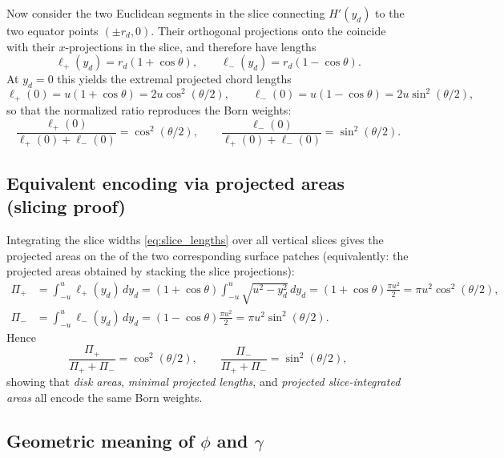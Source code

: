 Now consider the two Euclidean segments in the slice connecting \(H'(y_d)\) to the two equator points \((\pm r_d,0)\).
Their orthogonal projections onto the \xyplane coincide with their \(x\)-projections in the slice, and therefore have lengths
\begin{equation}
\label{eq:slice_lengths}
\ell_+(y_d)=r_d(1+\cos\theta),
\qquad
\ell_-(y_d)=r_d(1-\cos\theta).
\end{equation}
At \(y_d=0\) this yields the extremal projected chord lengths
\[
\ell_+(0)=u(1+\cos\theta)=2u\cos^2(\theta/2),
\qquad
\ell_-(0)=u(1-\cos\theta)=2u\sin^2(\theta/2),
\]
so that the normalized ratio reproduces the Born weights:
\begin{equation}
\label{eq:born_from_lengths}
\frac{\ell_+(0)}{\ell_+(0)+\ell_-(0)}=\cos^2(\theta/2),
\qquad
\frac{\ell_-(0)}{\ell_+(0)+\ell_-(0)}=\sin^2(\theta/2).
\end{equation}

\subsection{Equivalent encoding via projected areas (slicing proof)}
\label{sec:born_projected_areas}

Integrating the slice widths \eqref{eq:slice_lengths} over all vertical slices gives the projected areas on the \xyplane{} of the two corresponding surface patches (equivalently: the projected areas obtained by stacking the slice projections):
\begin{align}
\Pi_+
&=\int_{-u}^{u}\ell_+(y_d)\,dy_d
=(1+\cos\theta)\int_{-u}^{u}\sqrt{u^2-y_d^2}\,dy_d
=(1+\cos\theta)\frac{\pi u^2}{2}
=\pi u^2\cos^2(\theta/2),
\\
\Pi_-
&=\int_{-u}^{u}\ell_-(y_d)\,dy_d
=(1-\cos\theta)\frac{\pi u^2}{2}
=\pi u^2\sin^2(\theta/2).
\end{align}
Hence
\begin{equation}
\label{eq:born_from_projected_areas}
\frac{\Pi_+}{\Pi_++\Pi_-}=\cos^2(\theta/2),
\qquad
\frac{\Pi_-}{\Pi_++\Pi_-}=\sin^2(\theta/2),
\end{equation}
showing that \emph{disk areas}, \emph{minimal projected lengths}, and \emph{projected slice-integrated areas} all encode the same Born weights.

\subsection{Geometric meaning of \texorpdfstring{\(\phi\)}{phi} and \texorpdfstring{\(\gamma\)}{gamma}}
\label{sec:phase_geometry}

